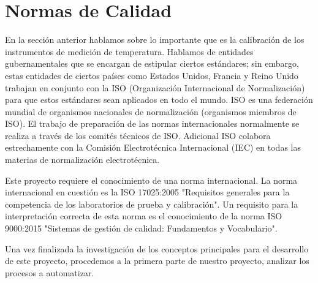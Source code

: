 \section{Normas de Calidad}

\par 
En la sección anterior hablamos sobre lo importante que es la calibración de los instrumentos de medición de temperatura. Hablamos de entidades gubernamentales que se encargan de estipular ciertos estándares; sin embargo, estas entidades de ciertos países como Estados Unidos, Francia y Reino Unido trabajan en conjunto con la ISO (Organización Internacional de Normalización) para que estos estándares sean aplicados en todo el mundo. ISO es una federación mundial de organismos nacionales de normalización (organismos miembros de ISO). El trabajo de preparación de las normas internacionales normalmente se realiza a través de los comités técnicos de ISO. Adicional ISO colabora estrechamente con la Comisión Electrotécnica Internacional (IEC) en todas las materias de normalización electrotécnica.

\par \noindent
Este proyecto requiere el conocimiento de una norma internacional. La norma internacional en cuestión es la ISO 17025:2005 "Requisitos generales para la competencia de los laboratorios de prueba y calibración". Un requisito para la interpretación correcta de esta norma es el conocimiento de la norma ISO 9000:2015 "Sistemas de gestión de calidad: Fundamentos y Vocabulario". 





\par \noindent
Una vez finalizada la investigación de los conceptos principales para el desarrollo de este proyecto, procedemos a la primera parte de nuestro proyecto, analizar los procesos a automatizar.


